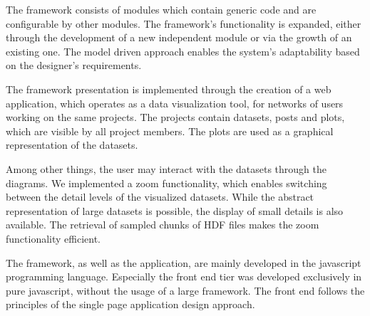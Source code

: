 	The framework consists of modules which contain generic code and are configurable by other modules. The framework's functionality is expanded, either through the development of a new independent module or via the growth of an existing one. The model driven approach enables the system's adaptability based on the designer's requirements. \par 
	The framework presentation is implemented through the creation of a web application, which operates as a data visualization tool, for networks of users working on the same projects. The projects contain datasets, posts and plots, which are visible by all project members. The plots are used as a graphical representation of the datasets. \par
	Among other things, the user may interact with the datasets through the diagrams. We implemented a zoom functionality, which enables  switching between the detail levels of the visualized datasets. While the abstract representation of large datasets is possible, the display of small details is also available. The retrieval of sampled chunks of HDF files makes the zoom functionality efficient.   \par 
	The framework, as well as the application, are mainly developed in the javascript programming language. Especially the front end tier was developed exclusively in pure javascript, without the usage of a large framework. The front end follows the principles of the single page application design approach.


